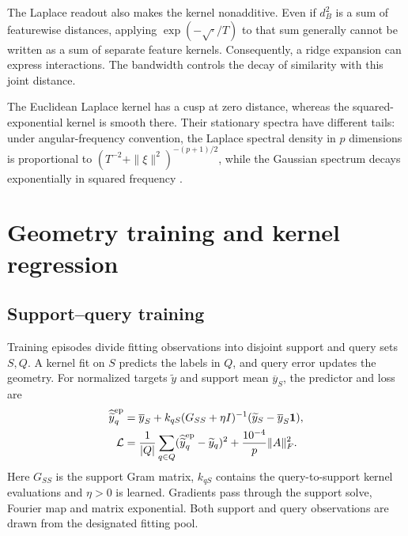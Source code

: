 \documentclass[11pt]{article}
\newcommand{\one}{\bm 1}
\begin{document}
The Laplace readout also makes the kernel nonadditive. Even if $d_B^2$ is a sum of featurewise distances, applying $\exp(-\sqrt{\cdot}/T)$ to that sum generally cannot be written as a sum of separate feature kernels. Consequently, a ridge expansion can express interactions. The bandwidth controls the decay of similarity with this joint distance.

The Euclidean Laplace kernel has a cusp at zero distance, whereas the squared-exponential kernel is smooth there. Their stationary spectra have different tails: under angular-frequency convention, the Laplace spectral density in $p$ dimensions is proportional to $(T^{-2}+\|\xi\|^2)^{-(p+1)/2}$, while the Gaussian spectrum decays exponentially in squared frequency \cite[Section~4.2.1, eq.~(4.15) with $\nu=1/2$]{rasmussen2006}.

\section{Geometry training and kernel regression}
\subsection{Support--query training}
Training episodes divide fitting observations into disjoint support and query sets $S,Q$. A kernel fit on $S$ predicts the labels in $Q$, and query error updates the geometry. For normalized targets $\widetilde y$ and support mean $\overline y_S$, the predictor and loss are
\begin{align}
 \widehat{\widetilde y}^{\rm ep}_q
 &=\overline y_S+k_{qS}(G_{SS}+\eta I)^{-1}
       (\widetilde y_S-\overline y_S\one),\\
 \mathcal L&=\frac1{|Q|}\sum_{q\in Q}
  (\widehat{\widetilde y}^{\rm ep}_q-\widetilde y_q)^2
       +\frac{10^{-4}}p\|A\|_F^2.
 \label{eq:episode}
\end{align}
Here $G_{SS}$ is the support Gram matrix, $k_{qS}$ contains the query-to-support kernel evaluations and $\eta>0$ is learned. Gradients pass through the support solve, Fourier map and matrix exponential. Both support and query observations are drawn from the designated fitting pool.
\end{document}
